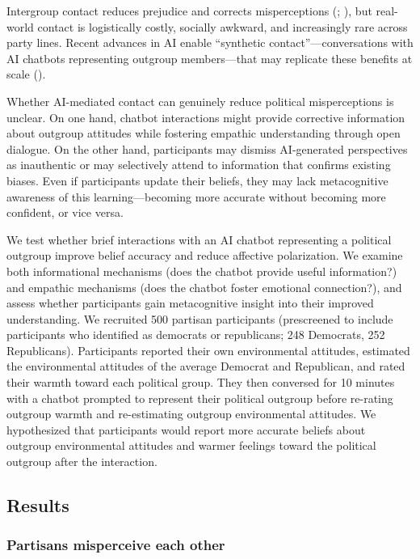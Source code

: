 \documentclass[
  11pt,
  oneside]{article}
\begin{document}
Intergroup contact reduces prejudice and corrects misperceptions
(;
),
but real-world contact is logistically costly, socially awkward, and
increasingly rare across party lines. Recent advances in AI enable
``synthetic contact''---conversations with AI chatbots representing
outgroup members---that may replicate these benefits at scale
().

Whether AI-mediated contact can genuinely reduce political
misperceptions is unclear. On one hand, chatbot interactions might
provide corrective information about outgroup attitudes while fostering
empathic understanding through open dialogue. On the other hand,
participants may dismiss AI-generated perspectives as inauthentic or may
selectively attend to information that confirms existing biases. Even if
participants update their beliefs, they may lack metacognitive awareness
of this learning---becoming more accurate without becoming more
confident, or vice versa.

We test whether brief interactions with an AI chatbot representing a
political outgroup improve belief accuracy and reduce affective
polarization. We examine both informational mechanisms (does the chatbot
provide useful information?) and empathic mechanisms (does the chatbot
foster emotional connection?), and assess whether participants gain
metacognitive insight into their improved understanding. We recruited
500 partisan participants (prescreened to include participants who
identified as democrats or republicans; 248 Democrats, 252 Republicans).
Participants reported their own environmental attitudes, estimated the
environmental attitudes of the average Democrat and Republican, and
rated their warmth toward each political group. They then conversed for
10 minutes with a chatbot prompted to represent their political outgroup
before re-rating outgroup warmth and re-estimating outgroup
environmental attitudes. We hypothesized that participants would report
more accurate beliefs about outgroup environmental attitudes and warmer
feelings toward the political outgroup after the interaction.

\subsection{Results}\label{results}

\subsubsection{Partisans misperceive each
other}\label{partisans-misperceive-each-other}
\end{document}
